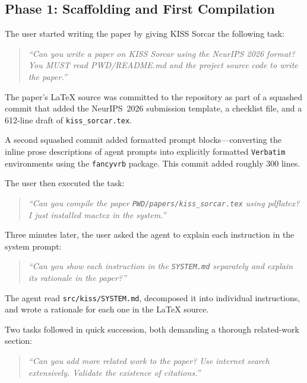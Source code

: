 \documentclass{article}
\begin{document}
\subsection{Phase 1: Scaffolding and First Compilation}
\label{sec:phase1}

The user started writing the paper by giving KISS Sorcar the following task: 
\begin{quote}
\textit{``Can you write a paper on KISS Sorcar using the NeurIPS 2026 format? You MUST read PWD/README.md and the project source code to write the paper.''}
\end{quote}

The paper's \LaTeX{} source was committed to the repository as part of a squashed commit that added the NeurIPS~2026 submission template, a checklist file, and a 612-line draft of \texttt{kiss\_sorcar.tex}.  

A second squashed commit added formatted prompt blocks---converting the inline prose descriptions of agent prompts into explicitly formatted \texttt{Verbatim} environments using the \texttt{fancyvrb} package.  This commit added roughly 300 lines.

The user then executed the task:

\begin{quote}
\textit{``Can you compile the paper \texttt{PWD/papers/kiss\_sorcar.tex} using pdflatex?  I just installed mactex in the system.''}
\end{quote}

Three minutes later, the user asked the agent to explain each instruction in the system prompt:

\begin{quote}
\textit{``Can you show each instruction in the \texttt{SYSTEM.md} separately and explain its rationale in the paper?''}
\end{quote}

The agent read \texttt{src/kiss/SYSTEM.md}, decomposed it into individual instructions, and wrote a rationale for each one in the \LaTeX{} source.

Two tasks followed in quick succession, both demanding a thorough related-work section:

\begin{quote}
\textit{``Can you add more related work to the paper?  Use internet search extensively.  Validate the existence of citations.''}
\end{quote}
\end{document}
